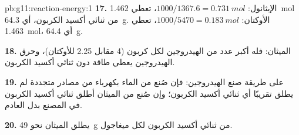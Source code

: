 \begin{solution}{pb:g11:reaction-energy:1}
\textbf{17.} الإيثانول: $1000 / 1367.6 = \qty{0.731}{mol}$، تعطي
\qty{1.462}{mol} من ثنائي أكسيد الكربون، أي \qty{64.3}{g}. الأوكتان:
$1000 / 5470 = \qty{0.183}{mol}$، تعطي \qty{1.463}{mol}، أي \qty{64.4}{g}.

\textbf{18.} الميثان: فله أكبر عدد من  الهيدروجين لكل  كربون (4
مقابل 2.25 للأوكتان)، وحرق الهيدروجين يعطي طاقة دون
ثنائي أكسيد الكربون.

\textbf{19.} على طريقة صنع الهيدروجين: فإن صُنع من الماء بكهرباء
من مصادر متجددة لم يطلق تقريبًا أي ثنائي أكسيد الكربون؛ وإن صُنع من
الميثان أطلق ثنائي أكسيد الكربون في المصنع بدل
العادم.

\textbf{20.} يطلق الميثان نحو \qty{49}{g} من ثنائي أكسيد الكربون لكل
ميغاجول.
\end{solution}
